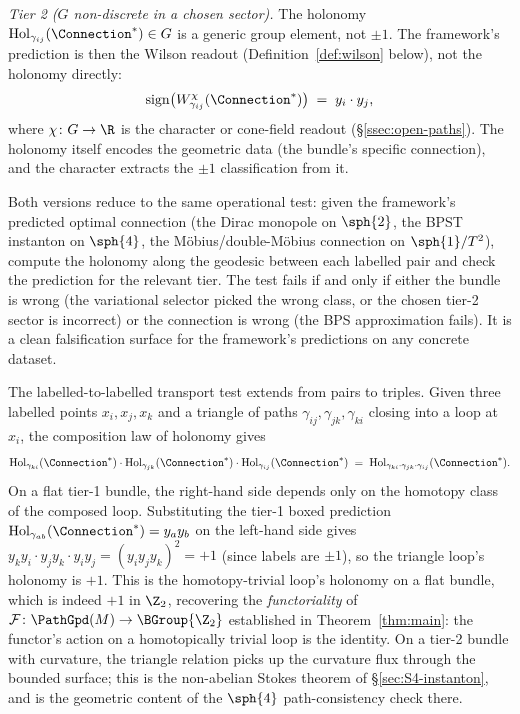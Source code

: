 \emph{Tier 2 ($G$ non-discrete in a chosen sector).} The holonomy
$\mathrm{Hol}_{\gamma_{ij}}(\Connection^*)\in G$ is a generic group
element, not $\pm 1$. The framework's prediction is then the Wilson
readout (Definition~\ref{def:wilson} below), not the holonomy
directly:
\[
   \mathrm{sign}\bigl(W_{\gamma_{ij}}^\chi(\Connection^*)\bigr)
   \;=\; y_i\cdot y_j,
\]
where $\chi\colon G\to\R$ is the character or cone-field readout
(\S\ref{ssec:open-paths}). The holonomy itself encodes the geometric
data (the bundle's specific connection), and the character extracts
the $\pm 1$ classification from it.

Both versions reduce to the same operational test: given the
framework's predicted optimal connection (the Dirac monopole on
$\sph{2}$, the BPST instanton on $\sph{4}$, the M\"obius/double-M\"obius
connection on $\sph{1}/T^2$), compute the holonomy along the geodesic
between each labelled pair and check the prediction for the
relevant tier. The test
fails if and only if either the bundle is wrong (the variational
selector picked the wrong class, or the chosen tier-2 sector is
incorrect) or the connection is wrong (the BPS approximation fails).
It is a clean falsification surface for the framework's predictions
on any concrete dataset.

\begin{remark}[Triangle consistency = functoriality of $\mathcal{F}$]
\label{rem:triangle-consistency}
The labelled-to-labelled transport test extends from pairs to
triples. Given three labelled points $x_i,x_j,x_k$ and a triangle of
paths $\gamma_{ij},\gamma_{jk},\gamma_{ki}$ closing into a loop at
$x_i$, the composition law of holonomy gives
\[
   \mathrm{Hol}_{\gamma_{ki}}(\Connection^*)\cdot
   \mathrm{Hol}_{\gamma_{jk}}(\Connection^*)\cdot
   \mathrm{Hol}_{\gamma_{ij}}(\Connection^*)
   \;=\; \mathrm{Hol}_{\gamma_{ki}\cdot\gamma_{jk}\cdot\gamma_{ij}}(\Connection^*).
\]
On a flat tier-1 bundle, the right-hand side depends only on the
homotopy class of the composed loop. Substituting the tier-1 boxed
prediction
$\mathrm{Hol}_{\gamma_{ab}}(\Connection^*) = y_a y_b$ on the
left-hand side gives
$y_k y_i \cdot y_j y_k \cdot y_i y_j = (y_i y_j y_k)^2 = +1$
(since labels are $\pm 1$), so the triangle loop's holonomy is
$+1$. This is the homotopy-trivial loop's holonomy on a flat
bundle, which is indeed $+1$ in $\Z_2$, recovering the
\emph{functoriality} of $\mathcal{F}\colon\PathGpd(M)\to\BGroup{\Z_2}$
established in Theorem~\ref{thm:main}: the functor's action on a
homotopically trivial loop is the identity. On a tier-2 bundle with
curvature, the triangle relation picks up the curvature flux
through the bounded surface; this is the non-abelian Stokes theorem
of \S\ref{sec:S4-instanton}, and is the geometric content of the
$\sph{4}$ path-consistency check there.
\end{remark}

